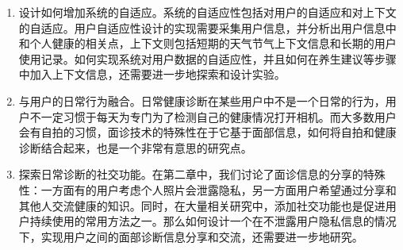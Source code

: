 \begin{enumerate}
	\item 设计如何增加系统的自适应。系统的自适应性包括对用户的自适应和对上下文的自适应。用户自适应性设计的实现需要采集用户信息，并分析出用户信息中和个人健康的相关点，上下文则包括短期的天气节气上下文信息和长期的用户使用记录。如何实现系统对用户数据的自适应性，并且如何在养生建议等步骤中加入上下文信息，还需要进一步地探索和设计实验。

	\item 与用户的日常行为融合。日常健康诊断在某些用户中不是一个日常的行为，用户不一定习惯于每天为专门为了检测自己的健康情况打开相机。而大多数用户会有自拍的习惯，面诊技术的特殊性在于它基于面部信息，如何将自拍和健康诊断结合起来，也是一个非常有意思的研究点。

	\item 探索日常诊断的社交功能。在第二章中，我们讨论了面诊信息的分享的特殊性：一方面有的用户考虑个人照片会泄露隐私，另一方面用户希望通过分享和其他人交流健康的知识。同时，在大量相关研究中，添加社交功能也是促进用户持续使用的常用方法之一。那么如何设计一个在不泄露用户隐私信息的情况下，实现用户之间的面部诊断信息分享和交流，还需要进一步地研究。
	
\end{enumerate}